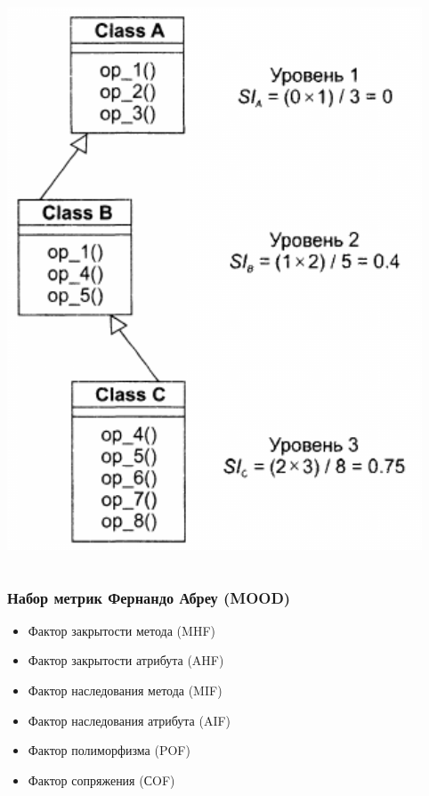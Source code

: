 \documentclass{../../slides-style}
\begin{document}
\begin{frame}
\begin{columns}
            \begin{column}{0.35\textwidth}
                \begin{center}
                    \includegraphics[width=\textwidth]{siCalculation.png}
                \end{center}
            \end{column}
        \end{columns}
    \end{frame}

    \begin{frame}
        \frametitle{Набор метрик Фернандо Абреу (MOOD)}
        \begin{itemize}
            \item Фактор закрытости метода (MHF)
            \item Фактор закрытости атрибута (AHF)
            \item Фактор наследования метода (MIF)
            \item Фактор наследования атрибута (AIF)
            \item Фактор полиморфизма (POF)
            \item Фактор сопряжения (СOF)
        \end{itemize}
    \end{frame}
\end{document}
